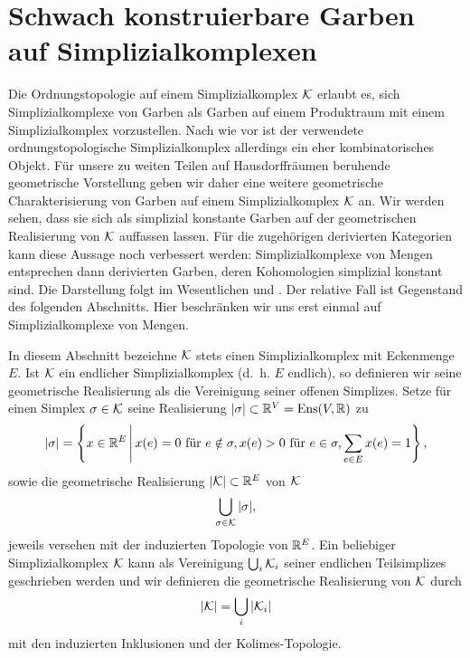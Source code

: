 
\section[Schwach konstruierbare Garben auf Simplizialkomplexen]
        {\texorpdfstring{Schwach konstruierbare Garben\\auf Simplizialkomplexen}
          {Schwach konstruierbare Garben auf Simplizialkomplexen}}
\label{sec:simp-comp-sk}

Die Ordnungstopologie auf einem Simplizialkomplex $\mathcal{K}$ erlaubt es,
sich Simplizialkomplexe von Garben als Garben auf einem Produktraum
mit einem Simplizialkomplex vorzustellen. Nach wie vor ist der
verwendete ordnungstopologische Simplizialkomplex allerdings ein eher
kombinatorisches Objekt. Für unsere zu weiten Teilen auf
Hausdorffräumen beruhende geometrische Vorstellung geben wir daher
eine weitere geometrische Charakterisierung von Garben auf einem
Simplizialkomplex $\mathcal{K}$ an. Wir werden sehen, dass sie sich als
simplizial konstante Garben auf der geometrischen Realisierung von
$\mathcal{K}$ auffassen lassen. Für die zugehörigen derivierten Kategorien kann
diese Aussage noch verbessert werden: Simplizialkomplexe von Mengen
entsprechen dann derivierten Garben, deren Kohomologien simplizial
konstant sind. Die Darstellung folgt im Wesentlichen \cite{KS} und
\cite{WS}. Der relative Fall ist Gegenstand des folgenden
Abschnitts. Hier beschränken wir uns erst einmal auf
Simplizialkomplexe von Mengen.

In diesem Abschnitt bezeichne $\mathcal{K}$ stets einen Simplizialkomplex mit
Eckenmenge $E$. Ist $\mathcal{K}$ ein endlicher Simplizialkomplex (d.~h. $E$
endlich), so definieren wir seine geometrische Realisierung als die
Vereinigung seiner offenen Simplizes. Setze für einen Simplex $\sigma
\in \mathcal{K}$ seine Realisierung $|\sigma| \subset \mathbb{R}^V = \operatorname{Ens}(V, \mathbb{R})$ zu
\[ |\sigma| = \left\{ x \in \mathbb{R}^E \,\middle|\, x(e) = 0 \text{ für } e \notin \sigma,
   x(e) > 0 \text{ für } e \in \sigma,
   \sum_{e \in E} x(e) = 1  \right\},
\]
sowie die geometrische Realisierung $|\mathcal{K}| \subset \mathbb{R}^E$ von $\mathcal{K}$
\[ \bigcup_{\sigma \in \mathcal{K}} |\sigma|, \]
jeweils versehen mit der induzierten Topologie von $\mathbb{R}^E$. Ein
beliebiger Simplizialkomplex $\mathcal{K}$ kann als Vereinigung $\bigcup_i
\mathcal{K}_i$ seiner endlichen Teilsimplizes geschrieben werden und wir
definieren die geometrische Realisierung von $\mathcal{K}$ durch
\[ |\mathcal{K}| = \bigcup_i |\mathcal{K}_i| \]
mit den induzierten Inklusionen und der Kolimes-Topologie.

